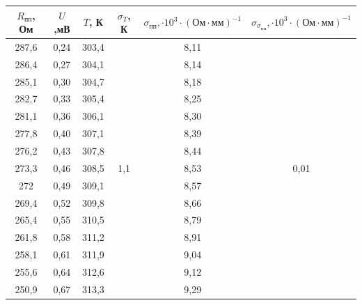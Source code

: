 \documentclass[a4paper,12pt]{report}
\begin{document}
\begin{table}[h!]
\begin{tabular}{|c|c|c|c|c|c|}
\hline
$R_{\text{пп}}$, Ом  &  $U$,мВ & $T$, К  & $\sigma_{T}$, К           & $\sigma_{\text{пп}}, \cdot 10^{3} \cdot (\text{Ом}\cdot\text{мм})^{-1}$ & $\sigma_{\sigma_{\text{пп}}}, \cdot 10^{3} \cdot (\text{Ом}\cdot\text{мм})^{-1}$\\ \hline
287,6     & 0,24 & 303,4 & \multirow{36}{*}{1,1} & 8,11      & \multirow{20}{*}{0,01} \\ \cline{1-3} \cline{5-5}
286,4     & 0,27 & 304,1 &                       & 8,14      &                        \\ \cline{1-3} \cline{5-5}
285,1     & 0,30 & 304,7 &                       & 8,18      &                        \\ \cline{1-3} \cline{5-5}
282,7     & 0,33 & 305,4 &                       & 8,25      &                        \\ \cline{1-3} \cline{5-5}
281,1     & 0,36 & 306,1 &                       & 8,30      &                        \\ \cline{1-3} \cline{5-5}
277,8     & 0,40 & 307,1 &                       & 8,39      &                        \\ \cline{1-3} \cline{5-5}
276,2     & 0,43 & 307,8 &                       & 8,44      &                        \\ \cline{1-3} \cline{5-5}
273,3     & 0,46 & 308,5 &                       & 8,53      &                        \\ \cline{1-3} \cline{5-5}
272       & 0,49 & 309,1 &                       & 8,57      &                        \\ \cline{1-3} \cline{5-5}
269,4     & 0,52 & 309,8 &                       & 8,66      &                        \\ \cline{1-3} \cline{5-5}
265,4     & 0,55 & 310,5 &                       & 8,79      &                        \\ \cline{1-3} \cline{5-5}
261,8     & 0,58 & 311,2 &                       & 8,91      &                        \\ \cline{1-3} \cline{5-5}
258,1     & 0,61 & 311,9 &                       & 9,04      &                        \\ \cline{1-3} \cline{5-5}
255,6     & 0,64 & 312,6 &                       & 9,12      &                        \\ \cline{1-3} \cline{5-5}
250,9     & 0,67 & 313,3 &                       & 9,29      &                        \\ \cline{1-3} \cline{5-5}

\end{tabular}
\end{table}
\end{document}
